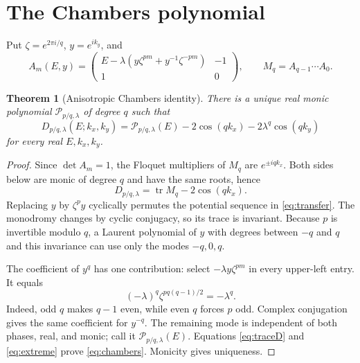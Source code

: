 \documentclass[10pt]{article}
\newtheorem{theorem}{Theorem}
\newcommand{\PP}{\mathcal P}
\begin{document}
\section{The Chambers polynomial}
Put $\zeta=e^{2\pi i/q}$, $y=e^{ik_y}$, and
\begin{equation}
 A_m(E,y)=
 \begin{pmatrix}
 E-\lambda(y\zeta^{pm}+y^{-1}\zeta^{-pm})&-1\\
 1&0
 \end{pmatrix},
 \qquad M_q=A_{q-1}\cdots A_0 .
 \label{eq:transfer}
\end{equation}

\begin{theorem}[Anisotropic Chambers identity]\label{thm:chambers}
There is a unique real monic polynomial $\PP_{p/q,\lambda}$ of degree $q$
such that
\begin{equation}
 D_{p/q,\lambda}(E;k_x,k_y)
 =\PP_{p/q,\lambda}(E)-2\cos(qk_x)
 -2\lambda^q\cos(qk_y)
 \label{eq:chambers}
\end{equation}
for every real $E,k_x,k_y$.
\end{theorem}

\begin{proof}
Since $\det A_m=1$, the Floquet multipliers of $M_q$ are
$e^{\pm iqk_x}$.  Both sides below are monic of degree $q$ and have the
same roots, hence
\begin{equation}
 D_{p/q,\lambda}=\operatorname{tr}M_q-2\cos(qk_x).
 \label{eq:traceD}
\end{equation}
Replacing $y$ by $\zeta^p y$ cyclically permutes the potential sequence in
\eqref{eq:transfer}.  The monodromy changes by cyclic conjugacy, so its
trace is invariant.  Because $p$ is invertible modulo $q$, a Laurent
polynomial of $y$ with degrees between $-q$ and $q$ and this invariance can
use only the modes $-q,0,q$.

The coefficient of $y^q$ has one contribution: select
$-\lambda y\zeta^{pm}$ in every upper-left entry.  It equals
\begin{equation}
 (-\lambda)^q\zeta^{p q(q-1)/2}=-\lambda^q .
 \label{eq:extreme}
\end{equation}
Indeed, odd $q$ makes $q-1$ even, while even $q$ forces $p$ odd.  Complex
conjugation gives the same coefficient for $y^{-q}$.  The remaining mode
is independent of both phases, real, and monic; call it
$\PP_{p/q,\lambda}(E)$.  Equations \eqref{eq:traceD} and
\eqref{eq:extreme} prove \eqref{eq:chambers}.  Monicity gives uniqueness.
\end{proof}
\end{document}
